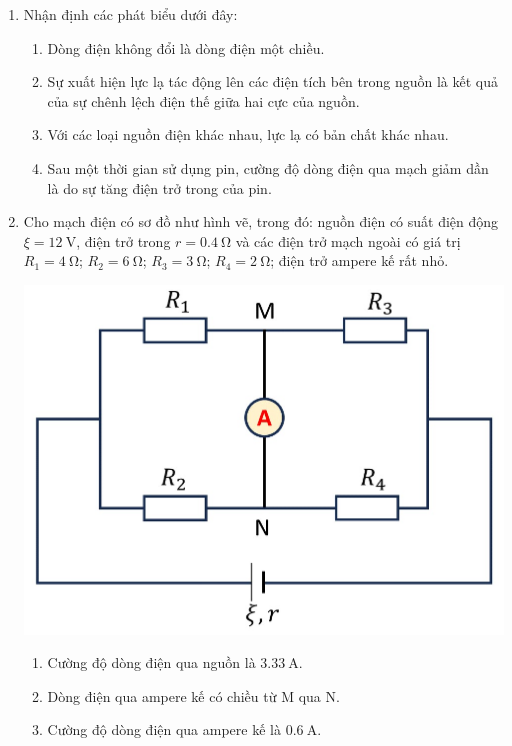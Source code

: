 \begin{enumerate}[label=\bfseries Câu \arabic*:]
	\item Nhận định các phát biểu dưới đây:
	\begin{enumerate}[label=\alph*)]
		\item Dòng điện không đổi là dòng điện một chiều.
		\item Sự xuất hiện lực lạ tác động lên các điện tích bên trong nguồn là kết quả của sự chênh lệch điện thế giữa hai cực của nguồn.
		\item Với các loại nguồn điện khác nhau, lực lạ có bản chất khác nhau.
		\item Sau một thời gian sử dụng pin, cường độ dòng điện qua mạch giảm dần là do sự tăng điện trở trong của pin.
	\end{enumerate}
	\item Cho mạch điện có sơ đồ như hình vẽ, trong đó: nguồn điện có suất điện động $\xi=\SI{12}{\volt}$, điện trở trong $r=\SI{0.4}{\ohm}$ và các điện trở mạch ngoài có giá trị $R_1=\SI{4}{\ohm}$; $R_2=\SI{6}{\ohm}$; $R_3=\SI{3}{\ohm}$; $R_4=\SI{2}{\ohm}$; điện trở ampere kế rất nhỏ.
	\begin{center}
		\includegraphics[width=0.5\linewidth]{../figs/PH11-FinalSem2-02-4}
	\end{center}
\begin{enumerate}[label=\alph*)]
	\item Cường độ dòng điện qua nguồn là $\SI{3.33}{\ampere}$.
	\item Dòng điện qua ampere kế có chiều từ M qua N.
	\item Cường độ dòng điện qua ampere kế là $\SI{0.6}{\ampere}$.

\end{enumerate}
\end{enumerate}
